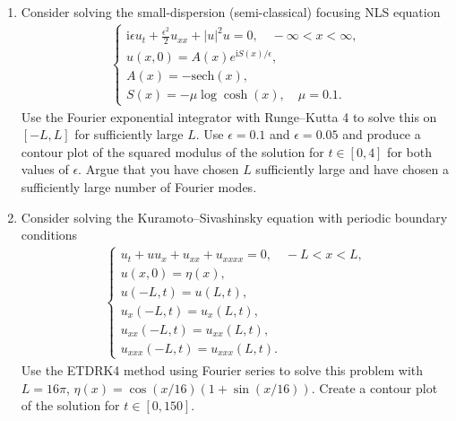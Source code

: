 \documentclass[10pt]{amsart}
\newcommand{\I}{\text{i}}
\begin{document}
\begin{enumerate}[label={\bf Problem~{\arabic*}:}]
    \item Consider solving the small-dispersion (semi-classical) focusing NLS equation
  \begin{align*}
    \begin{cases}
      \I \epsilon u_t + \frac{\epsilon^2}{2} u_{xx} + |u|^2 u = 0, \quad -\infty < x < \infty,\\
      u(x,0) = A(x) e^{\I S(x)/\epsilon},\\
      A(x) = - \mathrm{sech}(x),\\
      S(x) = - \mu \log \cosh (x), \quad \mu = 0.1.
    \end{cases}
    \end{align*}
    Use the Fourier exponential integrator with Runge--Kutta 4 to solve this on $[-L, L]$ for sufficiently large $L$.  Use $\epsilon = 0.1$ and $\epsilon = 0.05$ and produce a contour plot of the squared modulus of the solution for $t \in [0,4]$ for both values of $\epsilon$.  Argue that you have chosen $L$ sufficiently large and have chosen a sufficiently large number of Fourier modes.

    \mline

    \item Consider solving the Kuramoto--Sivashinsky equation with periodic boundary conditions
 \begin{align*}
    \begin{cases} u_t + u u_x + u_{xx} + u_{xxxx} = 0, \quad -L < x <L,\\
      u(x,0) = \eta(x),\\
      u(-L,t) = u(L,t),\\
      u_x(-L,t) = u_x(L,t),\\
      u_{xx}(-L,t) = u_{xx}(L,t),\\
      u_{xxx}(-L,t) = u_{xxx}(L,t).
    \end{cases}
 \end{align*}
 Use the ETDRK4 method using Fourier series to solve this problem with $L = 16 \pi$, $\eta(x) = \cos(x/16) (1 + \sin(x/16))$.  Create a contour plot of the solution for $t \in [0,150]$.
        
  
\end{enumerate}



  
\end{document}
